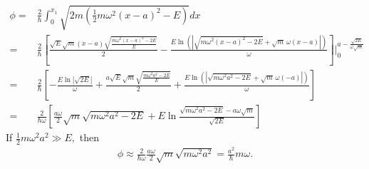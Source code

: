 \begin{enumerate}
\begin{align*}
        \phi =& \frac{2}{\hbar}\int_0^{x_1}\sqrt{2m(\frac{1}{2}m\omega^2(x-a)^2-E)}dx\\
        =&\frac{2}{\hbar}
        \left[\frac{\sqrt{E} \sqrt{m} \left(x - a\right) \sqrt{\frac{m{\omega}^{2} \left(x - a\right)^{2} - 2E}{E}}}{2} - \frac{E \ln\left(\left|\sqrt{m{\omega}^{2} \left(x - a\right)^{2} - 2E} + \sqrt{m} \, {\omega} \left(x - a\right)\right|\right)}{\omega}
        \right]\bigg|^{a-\frac{\sqrt{2E}}{\omega\sqrt{m}}}_0\\
        =&
        \frac{2}{\hbar}
        \left[
        -\frac{E\ln|\sqrt{2E}|}{\omega}
        +\frac{a\sqrt{E} \sqrt{m}  \sqrt{\frac{m{\omega}^{2} 
        a^2 - 2E}{E}}}{2} + 
        \frac{E \ln\left(\left|\sqrt{m{\omega}^{2} a^2 - 2E} + \sqrt{m} \, {\omega} \left(- a\right)\right|\right)}{\omega}
        \right]\\
        =&
        \frac{2}{\hbar\omega}
        \left[
        \frac{a\omega}{2}\sqrt{m}\sqrt{m\omega^2a^2-2E}
        +E\ln\frac{\sqrt{m\omega^2a^2-2E}-a\omega\sqrt{m}}{\sqrt{2E}}
        \right]
    \end{align*}
    If $\frac{1}{2}m\omega^2 a^2\gg E,$ then 
    \begin{align*}
        \phi \approx 
        \frac{2}{\hbar\omega}
        \frac{a\omega}{2}
        \sqrt{m}\sqrt{m\omega^2a^2}
        =\frac{a^2}{\hbar}m\omega.
    \end{align*}
\end{enumerate}


